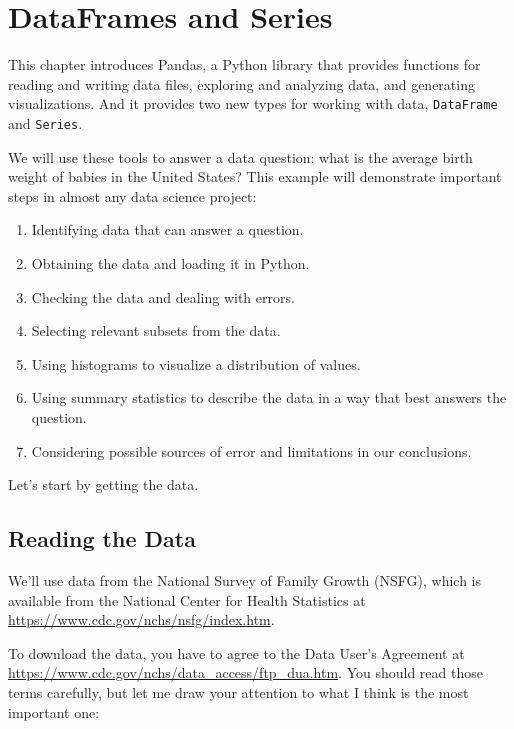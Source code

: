 \hypertarget{dataframes-and-series}{%
\chapter{DataFrames and Series}\label{dataframes-and-series}}

This chapter introduces Pandas, a Python library that provides functions
for reading and writing data files, exploring and analyzing data, and
generating visualizations. And it provides two new types for working
with data, \passthrough{\lstinline!DataFrame!} and
\passthrough{\lstinline!Series!}.

We will use these tools to answer a data question: what is the average
birth weight of babies in the United States? This example will
demonstrate important steps in almost any data science project:

\begin{enumerate}
\def\labelenumi{\arabic{enumi}.}
\item
  Identifying data that can answer a question.
\item
  Obtaining the data and loading it in Python.
\item
  Checking the data and dealing with errors.
\item
  Selecting relevant subsets from the data.
\item
  Using histograms to visualize a distribution of values.
\item
  Using summary statistics to describe the data in a way that best
  answers the question.
\item
  Considering possible sources of error and limitations in our
  conclusions.
\end{enumerate}

Let's start by getting the data.

\hypertarget{reading-the-data}{%
\section{Reading the Data}\label{reading-the-data}}

We'll use data from the National Survey of Family Growth (NSFG), which
is available from the National Center for Health Statistics at
\url{https://www.cdc.gov/nchs/nsfg/index.htm}.

To download the data, you have to agree to the Data User's Agreement at
\url{https://www.cdc.gov/nchs/data_access/ftp_dua.htm}. You should read
those terms carefully, but let me draw your attention to what I think is
the most important one:

